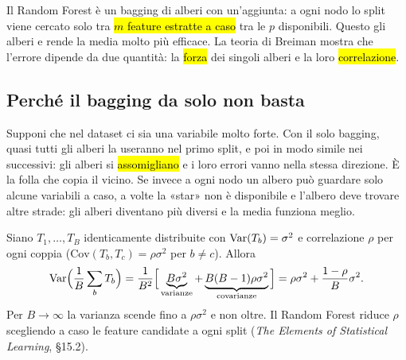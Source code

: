 
\begin{inbreve}
Il Random Forest è un bagging di alberi con un'aggiunta: a ogni nodo lo split viene cercato solo tra \hl{$m$ feature estratte a caso} tra le $p$ disponibili. Questo  gli alberi e rende la media molto più efficace. La teoria di Breiman mostra che l'errore dipende da due quantità: la \hl{forza} dei singoli alberi e la loro \hl{correlazione}.
\end{inbreve}

\subsection{Perché il bagging da solo non basta}

\begin{intuizione}
Supponi che nel dataset ci sia una variabile molto forte. Con il solo bagging, quasi tutti gli alberi la useranno nel primo split, e poi in modo simile nei successivi: gli alberi si \hl{assomigliano} e i loro errori vanno nella stessa direzione. È la folla che copia il vicino. Se invece a ogni nodo un albero può guardare solo alcune variabili a caso, a volte la «star» non è disponibile e l'albero deve trovare altre strade: gli alberi diventano più diversi e la media funziona meglio.
\end{intuizione}

\begin{tecnica}
Siano $T_1,\dots,T_B$ identicamente distribuite con $\operatorname{Var}(T_b)=\sigma^2$ e correlazione $\rho$ per ogni coppia ($\mathrm{Cov}(T_b,T_c)=\rho\sigma^2$ per $b\ne c$). Allora
\[
\operatorname{Var}\!\Big(\frac1B\sum_{b}T_b\Big)=\frac{1}{B^2}\Big[\underbrace{B\sigma^2}_{\text{varianze}}+\underbrace{B(B-1)\rho\sigma^2}_{\text{covarianze}}\Big]
=\rho\sigma^2+\frac{1-\rho}{B}\sigma^2 .
\]
Per $B\to\infty$ la varianza scende fino a $\rho\sigma^2$ e non oltre. Il Random Forest riduce $\rho$ scegliendo a caso le feature candidate a ogni split (\emph{The Elements of Statistical Learning}, §15.2).
\end{tecnica}

\par\noindent\begin{minipage}{\linewidth}
\end{minipage}\par


